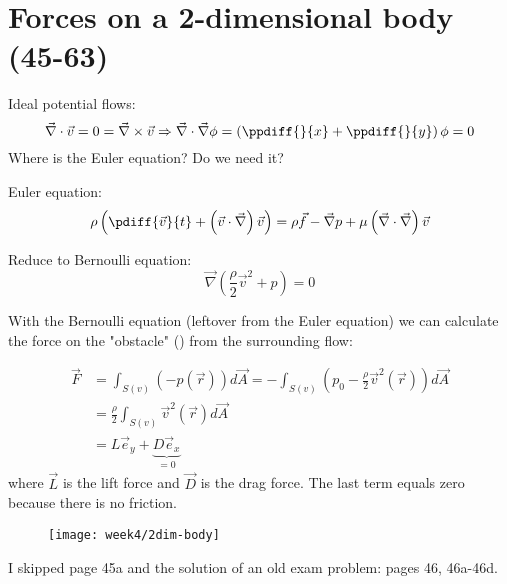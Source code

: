 \section{Forces on a 2-dimensional body (45-63)}

\begin{framed}
Ideal potential flows:
\begin{equation}
\vec{\nabla}\cdot\vec{v}=0=\vec{\nabla}\times\vec{v}\Rightarrow\vec{\nabla}\cdot\vec{\nabla}\phi = \left(\ppdiff{}{x}+\ppdiff{}{y}\right)\phi=0
\end{equation}
Where is the Euler equation? Do we need it?
\end{framed}

Euler equation:
\begin{equation}
\rho \left(\pdiff{\vec{v}}{t}+\left(\vec{v}\cdot\vec{\nabla}\right)\vec{v}\right) = \rho \vec{f} - \vec{\nabla}p + \mu\left(\vec{\nabla}\cdot\vec{\nabla}\right)\vec{v}
\end{equation}

Reduce to Bernoulli equation:
\begin{equation}
\vec{\nabla}\left(\frac{\rho}{2}\vec{v}^2+p\right)=0
\end{equation}

With the Bernoulli equation (leftover from the Euler equation) we can calculate the force on the "obstacle" () from the surrounding flow:

\begin{align}
\vec{F} &= \int_{S(v)}(-p(\vec{r}))d\vec{A} = -\int_{S(v)}\left(p_0-\frac{\rho}{2}\vec{v}^2(\vec{r})\right)d\vec{A} \\
&= \frac{\rho}{2}\int_{S(v)}\vec{v}^2(\vec{r})d\vec{A}\\
&= L\vec{e}_y +\underbrace{D\vec{e}_x}_{=0}
\end{align}
where $\vec{L}$ is the lift force and $\vec{D}$ is the drag force. The last term equals zero because there is no friction.

\begin{figure}[!h]
    \centering
    \texttt{[image: week4/2dim-body]}\\
    \caption{}
    \label{fig:2dim-body}
\end{figure}

\begin{shaded}
I skipped page 45a and the solution of an old exam problem: pages 46, 46a-46d.
\end{shaded}

